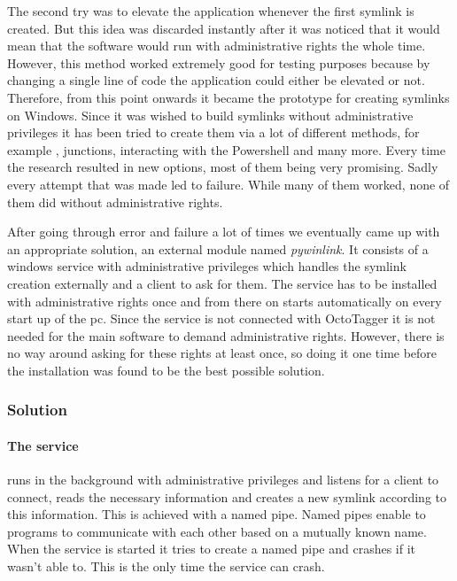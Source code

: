 The second try was to elevate the application whenever the first symlink is created. But this idea was discarded instantly after it was noticed that it would mean that the software would run with administrative rights the whole time. However, this method worked extremely good for testing purposes because by changing a single line of code the application could either be elevated or not. Therefore, from this point onwards it became the prototype for creating symlinks on Windows.
Since it was wished to build symlinks without administrative privileges it has been tried to create them via a lot of different methods, for example , junctions, interacting with the Powershell and many more. Every time the research resulted in new options, most of them being very promising. Sadly every attempt that was made led to failure. While many of them worked, none of them did without administrative rights.
 
After going through error and failure a lot of times we eventually came up with an appropriate solution, an external module named \textit{pywinlink}. It consists of a windows service with administrative privileges which handles the symlink creation externally and a client to ask for them. The service has to be installed with administrative rights once and from there on starts automatically on every start up of the pc. Since the service is not connected with OctoTagger it is not needed for the main software to demand administrative rights. However, there is no way around asking for these rights at least once, so doing it one time before the installation was found to be the best possible solution. 

\subsubsection{Solution} %

\paragraph{The service} runs in the background with administrative privileges
and listens for a client to connect, reads the necessary information and
creates a new symlink according to this information. This is achieved with a
named pipe. Named pipes enable to programs to communicate with each other based
on a mutually known name. When the service is started it tries to create a
named pipe and crashes if it wasn't able to. This is the only time the service
can crash.

